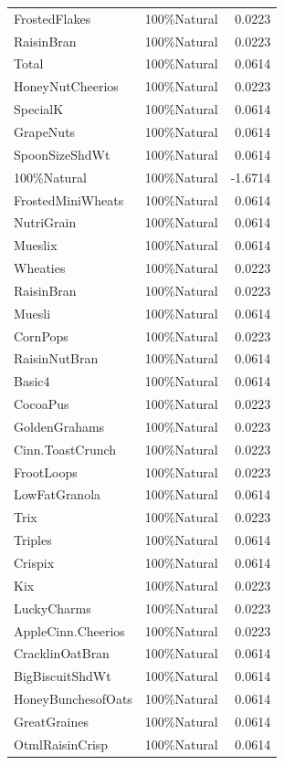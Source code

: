 \begin{longtable}{llr}
FrostedFlakes & 100\%Natural & 0.0223 \\
RaisinBran & 100\%Natural & 0.0223 \\
Total & 100\%Natural & 0.0614 \\
HoneyNutCheerios & 100\%Natural & 0.0223 \\
SpecialK & 100\%Natural & 0.0614 \\
GrapeNuts & 100\%Natural & 0.0614 \\
SpoonSizeShdWt & 100\%Natural & 0.0614 \\
100\%Natural & 100\%Natural & -1.6714 \\
FrostedMiniWheats & 100\%Natural & 0.0614 \\
NutriGrain & 100\%Natural & 0.0614 \\
Mueslix & 100\%Natural & 0.0614 \\
Wheaties & 100\%Natural & 0.0223 \\
RaisinBran & 100\%Natural & 0.0223 \\
Muesli & 100\%Natural & 0.0614 \\
CornPops & 100\%Natural & 0.0223 \\
RaisinNutBran & 100\%Natural & 0.0614 \\
Basic4 & 100\%Natural & 0.0614 \\
CocoaPus & 100\%Natural & 0.0223 \\
GoldenGrahams & 100\%Natural & 0.0223 \\
Cinn.ToastCrunch & 100\%Natural & 0.0223 \\
FrootLoops & 100\%Natural & 0.0223 \\
LowFatGranola & 100\%Natural & 0.0614 \\
Trix & 100\%Natural & 0.0223 \\
Triples & 100\%Natural & 0.0614 \\
Crispix & 100\%Natural & 0.0614 \\
Kix & 100\%Natural & 0.0223 \\
LuckyCharms & 100\%Natural & 0.0223 \\
AppleCinn.Cheerios & 100\%Natural & 0.0223 \\
CracklinOatBran & 100\%Natural & 0.0614 \\
BigBiscuitShdWt & 100\%Natural & 0.0614 \\
HoneyBunchesofOats & 100\%Natural & 0.0614 \\
GreatGraines & 100\%Natural & 0.0614 \\
OtmlRaisinCrisp & 100\%Natural & 0.0614 \\

\end{longtable}
